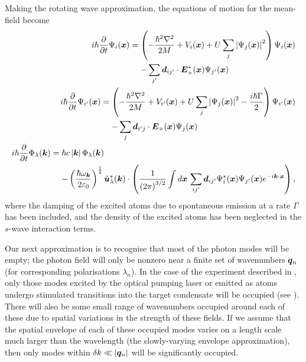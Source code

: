 Making the rotating wave approximation, the equations of motion for the mean-field become
\begin{subequations}
    \label{OpticalPumping:MeanFieldRWAEvolution}
    \begin{align}
        \begin{split}
            i \hbar \frac{\partial}{\partial t} \Psi_i(\vect{x}) &= \left( -\frac{\hbar^2 \nabla^2}{2M} + V_i(\vect{x}) + U \sum_j \abs{\Psi_j(\vect{x})}^2\right) \Psi_i(\vect{x})\\
            &\relphantom{=} - \sum_{j'} \vect{d}_{ij'} \cdot \vect{E}_+^*(\vect{x}) \Psi_{j'}(\vect{x})
        \end{split}\\
        \begin{split}
            i \hbar \frac{\partial}{\partial t} \Psi_{i'}(\vect{x}) &= \left( -\frac{\hbar^2 \nabla^2}{2M} + V_{i'}(\vect{x}) + U \sum_j \abs{\Psi_j(\vect{x})}^2 - \frac{i\hbar \Gamma}{2}\right) \Psi_{i'}(\vect{x})\\
            &\relphantom{=} - \sum_j \vect{d}_{i'j} \cdot \vect{E}_+(\vect{x}) \Psi_j(\vect{x}) 
        \end{split}\\
        \begin{split}
            i \hbar \frac{\partial}{\partial t} \Phi_\lambda(\vect{k}) &= \hbar c \abs{\vect{k}} \Phi_\lambda(\vect{k}) \\
            &\relphantom{=}- \left(\frac{\hbar \omega_{\vect{k}}}{2 \varepsilon_0}\right)^{\frac{1}{2}} \unitvec{u}_\lambda^*(\vect{k}) \cdot \left( \frac{1}{\left(2\pi\right)^{3/2}} \int d \vect{x}\, \sum_{ij'}\vect{d}_{ij'} \Psi^*_i(\vect{x}) \Psi_{j'}(\vect{x}) e^{-i \vect{k} \cdot \vect{x}} \right),
        \end{split}\label{OpticalPumping:MeanFieldPhotonRWAEvolution}
    \end{align}
\end{subequations}
where the damping of the excited atoms due to spontaneous emission at a rate $\Gamma$ has been included, and the density of the excited atoms has been neglected in the $s$-wave interaction terms.

Our next approximation is to recognise that most of the photon modes will be empty; the photon field will only be nonzero near a finite set of wavenumbers $\bm{q}_n$ (for corresponding polarisations $\lambda_n$).  In the case of the experiment described in , only those modes excited by the optical pumping laser or emitted as atoms undergo stimulated transitions into the target condensate will be occupied (see ).  There will also be some small range of wavenumbers occupied around each of these due to spatial variations in the strength of these fields.  If we assume that the spatial envelope of each of these occupied modes varies on a length scale much larger than the wavelength (the slowly-varying envelope approximation), then only modes within $\delta k \ll \left|\bm{q}_n\right|$ will be significantly occupied.

